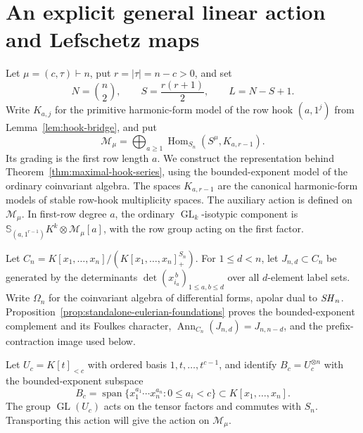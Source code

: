\section{An explicit general linear action and Lefschetz maps}
\label{sec:hook-action}

Let $\mu=(c,\tau)\vdash n$, put $r=|\tau|=n-c>0$, and set
\[
 N=\binom n2,\qquad S=\frac{r(r+1)}2,\qquad L=N-S+1.
\]
Write $K_{a,j}$ for the primitive harmonic-form model of the row hook
$(a,1^j)$ from Lemma~\ref{lem:hook-bridge}, and put
\[
 \mathcal M_\mu=\bigoplus_{a\ge1}
          \operatorname{Hom}_{S_n}(S^\mu,K_{a,r-1}).
\]
Its grading is the first row length $a$. We construct the representation
behind Theorem~\ref{thm:maximal-hook-series}, using the bounded-exponent
model of the ordinary coinvariant algebra.
The spaces $K_{a,r-1}$ are the canonical harmonic-form models of
stable row-hook multiplicity spaces. The auxiliary action is defined on $\mathcal M_\mu$.
In first-row degree $a$, the ordinary $\operatorname{GL}_k$-isotypic
component is $\mathbb S_{(a,1^{r-1})}K^k\otimes\mathcal M_\mu[a]$,
with the row group acting on the first factor.

Let $C_n=K[x_1,\ldots,x_n]/(K[x_1,\ldots,x_n]^{S_n}_+)$.
For $1\le d<n$, let $J_{n,d}\subset C_n$ be generated by the
determinants $\det(x_{i_a}^{\,b})_{1\le a,b\le d}$ over all
$d$-element label sets. Write $\Omega_n$ for the coinvariant algebra
of differential forms, apolar dual to $\mathit{SH}_n$.
Proposition~\ref{prop:standalone-eulerian-foundations} proves the
bounded-exponent complement and its Foulkes character,
$\operatorname{Ann}_{C_n}(J_{n,d})=J_{n,n-d}$, and the
prefix-contraction image used below.

Let $U_c=K[t]_{<c}$ with ordered basis $1,t,\ldots,t^{c-1}$, and
identify $B_c=U_c^{\otimes n}$ with the bounded-exponent subspace
\[
 B_c=\operatorname{span}\{x_1^{a_1}\cdots x_n^{a_n}:0\le a_i<c\}
                  \subset K[x_1,\ldots,x_n].
\]
The group $\operatorname{GL}(U_c)$ acts on the tensor factors and
commutes with $S_n$. Transporting this action will give the action on $\mathcal M_\mu$.

